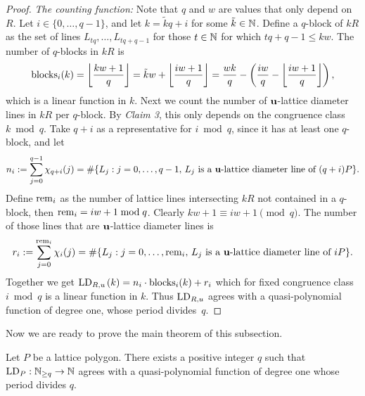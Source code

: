 \begin{proof}
    \textit{The counting function:} Note that $q$ and $w$ are values that only depend on $R$. Let $i \in \{0, \ldots, q-1\}$, and let $k=\tilde{k}q+i$ for some $\tilde{k} \in \mathbb{N}$. Define a $q$-block of $kR$ as the set of lines $L_{tq}, \ldots, L_{tq+q-1}$ for those $t \in \mathbb{N}$ for which $tq+q-1 \leq kw$. The number of $q$-blocks in $kR$ is
    \begin{align*}
         \operatorname{blocks}_i(k)  = \left \lfloor  \frac{kw+1}{q} \right\rfloor = \tilde{k}w + \left\lfloor \frac{iw+1}{q}\right\rfloor = \frac{wk}{q}  - \left( \frac{iw}{q} - \left\lfloor \frac{iw+1}{q} \right\rfloor \right),
    \end{align*}
    which is a linear function in $k$. Next we count the number of $\mathbf{u}$-lattice diameter lines in $kR$ per $q$-block. By \textit{Claim 3}, this only depends on the congruence class $k \bmod q$. Take $q+i$ as a representative for $i \bmod q$,
    since it has at least one $q$-block, and let
    \begin{align*}
        n_i := \sum_{j=0}^{q-1}\chi_{q+i}(j) = \# \{  L_j: j =0, \ldots, q-1,\, L_j \text{ is a $\mathbf{u}$-lattice diameter line of } (q+i)P\}.
    \end{align*}
    Define $\operatorname{rem}_i$ as the number of lattice lines intersecting $kR$ not contained in a $q$-block, then $\operatorname{rem}_i= iw+1 \bmod q$. Clearly $kw +1 \equiv iw+1 \pmod q$. 
    The number of those lines that are $\mathbf{u}$-lattice diameter lines is
    \begin{align*}
        r_i := \sum_{j=0}^{\operatorname{rem}_i} \chi_{i}(j)  = \# \{  L_j: j =0, \ldots, \operatorname{rem}_i, \, L_j \text{ is a $\mathbf{u}$-lattice diameter line of } iP\}.
    \end{align*}
    Together we get $\operatorname{LD}_{R,u\,}(k) = n_i \cdot \operatorname{blocks}_{i}(k) + r_i$ which for fixed congruence class $ i \bmod q$ is a linear function in $k$. Thus $\operatorname{LD}_{R,u}$ agrees with a quasi-polynomial function of degree one, whose period \mbox{divides $q$}.
\end{proof}

Now we are ready to prove the main theorem of this subsection.

\begin{theorem}\label{thm:QP}
    Let $P$ be a lattice polygon. There exists a positive integer $q$ such that \mbox{$\operatorname{LD}_P: \mathbb{N}_{\geq q} \to \mathbb{N}$} agrees with a quasi-polynomial function of degree one whose period divides $q$.
\end{theorem}


